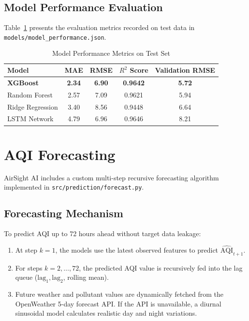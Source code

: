 \documentclass[12pt,a4paper]{article}
\begin{document}
\subsection{Model Performance Evaluation}
Table~\ref{tab:model_metrics} presents the evaluation metrics recorded on test data in \texttt{models/model\_performance.json}.

\begin{table}[htbp]
\centering
\caption{Model Performance Metrics on Test Set}
\label{tab:model_metrics}
\vspace{0.2cm}
\begin{tabular}{lcccc}
\toprule
\textbf{Model} & \textbf{MAE} & \textbf{RMSE} & \textbf{$R^2$ Score} & \textbf{Validation RMSE} \\
\midrule
\textbf{XGBoost} & \textbf{2.34} & \textbf{6.90} & \textbf{0.9642} & \textbf{5.72} \\
Random Forest & 2.57 & 7.09 & 0.9621 & 5.94 \\
Ridge Regression & 3.40 & 8.56 & 0.9448 & 6.64 \\
LSTM Network & 4.79 & 6.96 & 0.9646 & 8.21 \\
\bottomrule
\end{tabular}
\end{table}

\section{AQI Forecasting}

AirSight AI includes a custom multi-step recursive forecasting algorithm implemented in \texttt{src/prediction/forecast.py}.

\subsection{Forecasting Mechanism}
To predict AQI up to 72 hours ahead without target data leakage:
\begin{enumerate}
    \item At step $k=1$, the models use the latest observed features to predict $\widehat{\text{AQI}}_{t+1}$.
    \item For steps $k=2, \dots, 72$, the predicted AQI value is recursively fed into the lag queue ($\text{lag}_1, \text{lag}_2$, rolling mean).
    \item Future weather and pollutant values are dynamically fetched from the OpenWeather 5-day forecast API. If the API is unavailable, a diurnal sinusoidal model calculates realistic day and night variations.
\end{enumerate}
\end{document}
